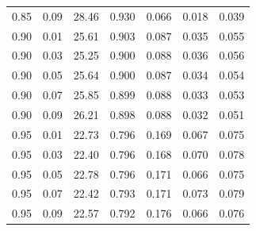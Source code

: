 \begin{table}[htbp]
\begin{tabular}{ccccccc}
0.85 & 0.09 & 28.46 & 0.930 & 0.066 & 0.018 & 0.039 \\
0.90 & 0.01 & 25.61 & 0.903 & 0.087 & 0.035 & 0.055 \\
0.90 & 0.03 & 25.25 & 0.900 & 0.088 & 0.036 & 0.056 \\
0.90 & 0.05 & 25.64 & 0.900 & 0.087 & 0.034 & 0.054 \\
0.90 & 0.07 & 25.85 & 0.899 & 0.088 & 0.033 & 0.053 \\
0.90 & 0.09 & 26.21 & 0.898 & 0.088 & 0.032 & 0.051 \\
0.95 & 0.01 & 22.73 & 0.796 & 0.169 & 0.067 & 0.075 \\
0.95 & 0.03 & 22.40 & 0.796 & 0.168 & 0.070 & 0.078 \\
0.95 & 0.05 & 22.78 & 0.796 & 0.171 & 0.066 & 0.075 \\
0.95 & 0.07 & 22.42 & 0.793 & 0.171 & 0.073 & 0.079 \\
0.95 & 0.09 & 22.57 & 0.792 & 0.176 & 0.066 & 0.076 \\
\bottomrule
\end{tabular}
\end{table}

